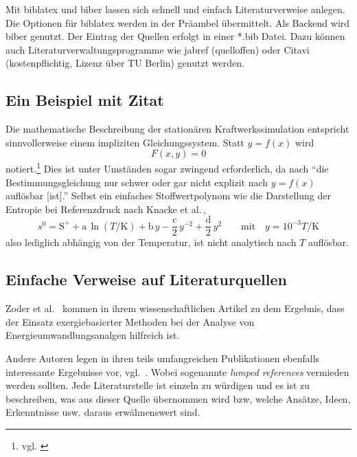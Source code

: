 Mit biblatex und biber lassen sich schnell und einfach Literaturverweise anlegen. Die Optionen für biblatex werden in der Präambel übermittelt. Als Backend wird biber genutzt. Der Eintrag der Quellen erfolgt in einer *.bib Datei. Dazu können auch Literaturverwaltungsprogramme wie jabref (quelloffen) oder Citavi (kostenpflichtig, Lizenz über TU Berlin) genutzt werden.

\subsection{Ein Beispiel mit Zitat}

Die mathematische Beschreibung der stationären Kraftwerkssimulation entspricht sinnvollerweise einem impliziten Gleichungssystem. Statt $y=f(x)$ wird 
\begin{equation}
F\left(x, y\right)=0
\end{equation}
notiert.\footnote{vgl. \cite[S.\,147]{papula2014}} Dies ist unter Umständen sogar zwingend erforderlich, da nach \cite[S.\,260]{westermann2011} "`die Bestimmungsgleichung nur schwer oder gar nicht explizit nach $y=f(x)$ auflösbar [ist]."' Selbst ein einfaches Stoffwertpolynom wie die Darstellung der Entropie bei Referenzdruck nach Knacke et al.\,\cite{knacke1991}, 
\begin{equation}
s^0=\text{S}^++\text{a}\,\ln(T/\text{K})+\text{b}\,y-\frac{\text{c}}{2}\,y^{-2}+\frac{\text{d}}{2}\,y^2\quad\quad\text{mit}\quad y=10^{-3}T/\text{K}
\label{eq:knacke_entropie}
\end{equation}
also lediglich abhängig von der Temperatur, ist nicht analytisch nach $T$ auflösbar.

\subsection{Einfache Verweise auf Literaturquellen}

Zoder et al.~\cite{zoder2018} kommen in ihrem wissenschaftlichen Artikel zu dem Ergebnis, dass der Einsatz exergiebasierter Methoden bei der Analyse von Energieumwandlungsanalgen hilfreich ist.

Andere Autoren legen in ihren teils umfangreichen Publikationen ebenfalls interessante Ergebnisse vor, vgl.~\cite{baehr1979,clausius1850,gasparovic1969,keenan1932,lojewski_urban1989}. Wobei sogenannte \textit{lumped references} vermieden werden sollten. Jede Literaturstelle ist einzeln zu würdigen und es ist zu beschreiben, was aus dieser Quelle übernommen wird bzw, welche Ansätze, Ideen, Erkenntnisse usw. daraus erwähnenswert sind.

